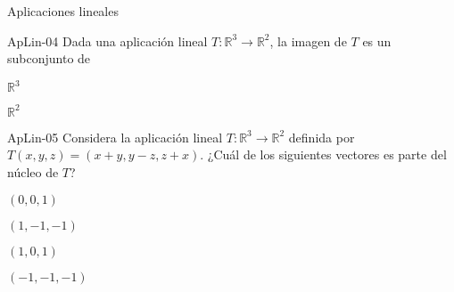 \documentclass[a4,11pt]{aleph-notas}
\begin{document}
\begin{quiz}{Aplicaciones lineales}
\begin{multi}[]%
    {ApLin-04}
    Dada una aplicación lineal \( T: \mathbb{R}^3 \rightarrow \mathbb{R}^2 \), la imagen de $T$ es un subconjunto de
    \item $\mathbb{R}^3$
    \item* $\mathbb{R}^2$
\end{multi}

\begin{multi}[]%
    {ApLin-05}
    Considera la aplicación lineal \( T: \mathbb{R}^3 \rightarrow \mathbb{R}^2 \) definida por \( T(x, y, z) = (x + y, y-z, z+x) \). ¿Cuál de los siguientes vectores es parte del núcleo de \( T \)?
    \item $(0, 0, 1)$
    \item* $(1, -1, -1)$
    \item $(1, 0, 1)$
    \item $(-1, -1, -1)$
\end{multi}

\end{quiz}
\end{document}
